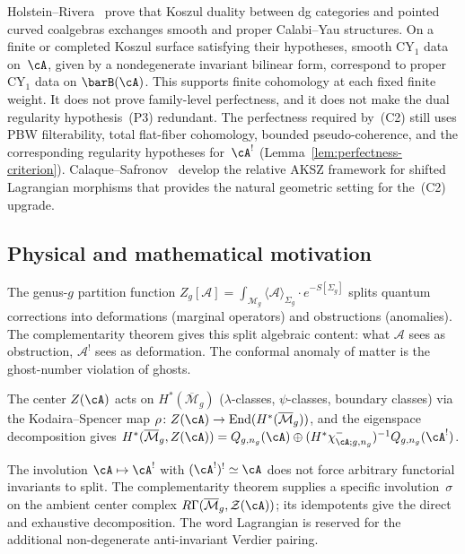 \begin{remark}
\label{rem:hr24-cy-interchange}
Holstein--Rivera~\cite{HR24} prove that Koszul duality
between dg categories and pointed curved coalgebras exchanges
smooth and proper Calabi--Yau structures. On a finite or completed
Koszul surface satisfying their hypotheses, smooth
$\mathrm{CY}_1$ data on~$\cA$, given by a nondegenerate invariant
bilinear form, correspond to proper $\mathrm{CY}_1$ data on
$\barB(\cA)$. This supports finite cohomology at each fixed finite
weight. It does not prove family-level perfectness, and it does not
make the dual regularity hypothesis~(P3) redundant. The
perfectness required by~(C2) still uses PBW filterability, total
flat-fiber cohomology, bounded pseudo-coherence, and the corresponding
regularity hypotheses for~$\cA^!$
(Lemma~\ref{lem:perfectness-criterion}).
Calaque--Safronov~\cite{CS24} develop the relative AKSZ
framework for shifted Lagrangian morphisms that provides
the natural geometric setting for the~(C2) upgrade.
\end{remark}

\subsection{Physical and mathematical motivation}

\begin{remark}
The genus-$g$ partition function
$Z_g[\mathcal{A}] = \int_{\mathcal{M}_g} \langle \mathcal{A} \rangle_{\Sigma_g}
\cdot e^{-S[\Sigma_g]}$
splits quantum corrections into deformations (marginal operators)
and obstructions (anomalies). The complementarity theorem gives
this split algebraic content: what $\mathcal{A}$ sees as obstruction,
$\mathcal{A}^!$ sees as deformation. The conformal
anomaly of matter is the ghost-number violation of ghosts.
\end{remark}

\begin{remark}
The center $Z(\cA)$ acts on $H^*(\overline{\mathcal{M}}_g)$
($\lambda$-classes, $\psi$-classes, boundary classes) via the
Kodaira--Spencer map
$\rho\colon Z(\cA)\to\mathrm{End}(H^*(\overline{\mathcal{M}}_g))$,
and the eigenspace decomposition gives
$H^*(\overline{\mathcal{M}}_g,Z(\cA))
=Q_{g,n_g}(\cA)\oplus
(H^*\chi^-_{\cA;g,n_g})^{-1}Q_{g,n_g}(\cA^!)$.
\end{remark}

\begin{remark}
The involution $\cA \mapsto \cA^!$ with $(\cA^!)^! \simeq \cA$
does not force arbitrary functorial invariants to split. The
complementarity theorem supplies a specific involution~$\sigma$ on
the ambient center complex
$R\Gamma(\overline{\mathcal{M}}_g,\mathcal{Z}(\cA))$; its
idempotents give the direct and exhaustive decomposition. The word
Lagrangian is reserved for the additional non-degenerate
anti-invariant Verdier pairing.
\end{remark}

